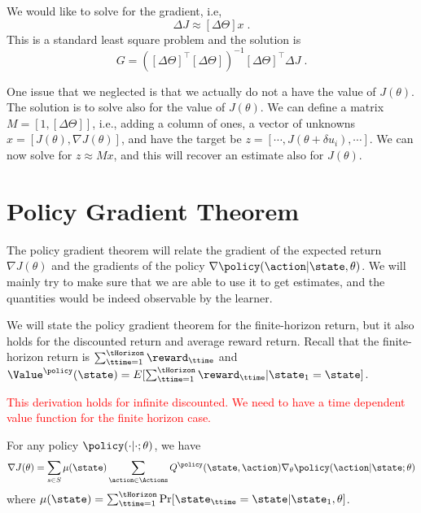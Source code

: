 We would like to solve for the gradient, i.e,
\[
\Delta J\approx [\Delta \Theta]x\;.
\]
This is a standard least square problem and the solution is
\[
G=([\Delta \Theta]^\top [\Delta \Theta])^{-1} [\Delta\Theta]^\top
\Delta J\;.
\]

One issue that we neglected is that we actually do not a have the
value of $J(\theta)$. The solution is to solve also for the value of
$J(\theta)$.
%
We can define a matrix $M=[1, [\Delta\Theta]]$, i.e., adding a column of ones, a vector of unknowns $x=[J(\theta), \nabla J(\theta)]$, and have the target be $z=[\cdots, J(\theta+\delta u_i),\cdots]$. We can now solve for $z\approx Mx$, and this will recover an estimate also for $J(\theta)$.


\section{Policy Gradient Theorem}

The policy gradient theorem will relate the gradient of the expected
return $\nabla J(\theta)$ and the gradients of the policy $\nabla
\policy(\action|\state,\theta)$. We will mainly try to make sure
that we are able to use it to get estimates, and the quantities
would be indeed observable by the learner.

We will state the policy gradient theorem for the finite-horizon
return, but it also holds for the discounted return and average
reward return. Recall that the finite-horizon return is
$\sum_{\ttime=1}^\tHorizon \reward_\ttime$ and
$\Value^\policy(\state)=E[\sum_{\ttime=1}^\tHorizon
\reward_\ttime|\state_1=\state]$.

\textcolor{red}{This derivation holds for infinite discounted. We need to have a time dependent value function for the finite horizon case.}

\begin{theorem}
\label{thm:policy-gradient} For any policy
$\policy(\cdot|\cdot;\theta)$, we have
\[
\nabla J(\theta)= \sum_{s\in S} \mu(\state) \sum_{\action\in
\Actions} Q^\policy (\state,\action)\nabla_\theta
\policy(\action|\state;\theta)
\]
where $\mu(\state)=\sum_{\ttime=1}^\tHorizon\Pr[\state_\ttime=\state|\state_1,\theta]$.
\end{theorem}

